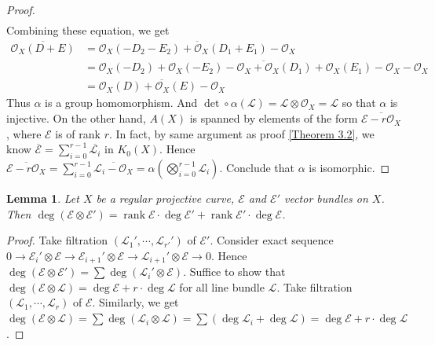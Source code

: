 \documentclass{ctexart}
\newtheorem{lemma}{Lemma}[section]
\newcommand{\rank}{\operatorname{rank}}
\begin{document}
\begin{proof}
\begin{equation}
\begin{split}
        \end{split}
    \end{equation}
    Combining these equation, we get
    \begin{equation}
        \begin{split}
            \overline{\mathcal{O}_{X}(D + E)} & = \overline{\mathcal{O}_{X}(-D_{2} - E_{2}) + \mathcal{O}_{X}(D_{1} + E_{1}) - \mathcal{O}_{X}} \\
            & = \overline{\mathcal{O}_{X}(-D_{2}) + \mathcal{O}_{X}(-E_{2}) - \mathcal{O}_{X} + \mathcal{O}_{X}(D_{1}) + \mathcal{O}_{X}(E_{1}) - \mathcal{O}_{X} - \mathcal{O}_{X}} \\
            & = \overline{\mathcal{O}_{X}(D) + \mathcal{O}_{X}(E) - \mathcal{O}_{X}}
        \end{split}
    \end{equation}
    Thus $\alpha$ is a group homomorphism.
    And $\det \circ \alpha(\mathcal{L}) = \mathcal{L} \otimes \mathcal{O}_{X} = \mathcal{L}$ so that $\alpha$ is injective.
    On the other hand, $A(X)$ is spanned by elements of the form $\overline{\mathcal{E} - r\mathcal{O}_{X}}$,
    where $\mathcal{E}$ is of rank $r$.
    In fact, by same argument as proof \ref{Theorem 3.2}, we know $\overline{\mathcal{E}} = \sum_{i = 0}^{r - 1} \overline{\mathcal{L}_{i}}$ in $K_{0}(X)$.
    Hence $\overline{\mathcal{E} - r\mathcal{O}_{X}} = \sum_{i = 0}^{r - 1} \overline{\mathcal{L}_{i} - \mathcal{O}_{X}} = \alpha(\bigotimes_{i = 0}^{r - 1} \mathcal{L}_{i})$.
    Conclude that $\alpha$ is isomorphic.
\end{proof}
\begin{lemma}
    Let $X$ be a regular projective curve, $\mathcal{E}$ and $\mathcal{E}'$ vector bundles on $X$.
    Then $\deg (\mathcal{E} \otimes \mathcal{E}') = \rank \mathcal{E} \cdot \deg \mathcal{E}' + \rank \mathcal{E}' \cdot \deg \mathcal{E}$.
    \label{Lemma 3.8}
\end{lemma}
\begin{proof}
    Take filtration $(\mathcal{L}_{1}', \cdots, \mathcal{L}_{r'}')$ of $\mathcal{E}'$.
    Consider exact sequence $0 \rightarrow \mathcal{E}_{i}' \otimes \mathcal{E} \rightarrow \mathcal{E}_{i + 1}' \otimes \mathcal{E} \rightarrow \mathcal{L}_{i + 1}' \otimes \mathcal{E} \rightarrow 0$.
    Hence $\deg (\mathcal{E} \otimes \mathcal{E}') = \sum \deg (\mathcal{L}_{i}' \otimes \mathcal{E})$.
    Suffice to show that $\deg (\mathcal{E} \otimes \mathcal{L}) = \deg \mathcal{E} + r \cdot \deg \mathcal{L}$ for all line bundle $\mathcal{L}$.
    Take filtration $(\mathcal{L}_{1}, \cdots, \mathcal{L}_{r})$ of $\mathcal{E}$.
    Similarly, we get $\deg (\mathcal{E} \otimes \mathcal{L}) = \sum \deg (\mathcal{L}_{i} \otimes \mathcal{L}) = \sum (\deg \mathcal{L}_{i} + \deg \mathcal{L}) = \deg \mathcal{E} + r \cdot \deg \mathcal{L}$.
\end{proof}
\end{document}
